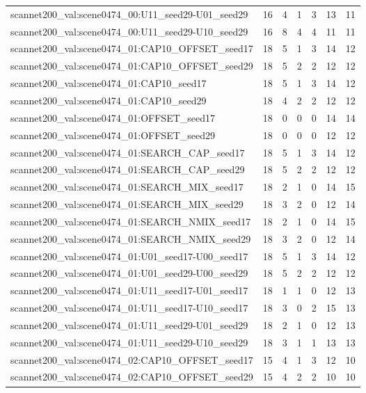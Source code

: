 \begin{table}[t]
\begin{tabular}{lrrrrrr}
scannet200\_val:scene0474\_00:U11\_seed29-U01\_seed29 & 16 & 4 & 1 & 3 & 13 & 11 \\
scannet200\_val:scene0474\_00:U11\_seed29-U10\_seed29 & 16 & 8 & 4 & 4 & 11 & 11 \\
scannet200\_val:scene0474\_01:CAP10\_OFFSET\_seed17 & 18 & 5 & 1 & 3 & 14 & 12 \\
scannet200\_val:scene0474\_01:CAP10\_OFFSET\_seed29 & 18 & 5 & 2 & 2 & 12 & 12 \\
scannet200\_val:scene0474\_01:CAP10\_seed17 & 18 & 5 & 1 & 3 & 14 & 12 \\
scannet200\_val:scene0474\_01:CAP10\_seed29 & 18 & 4 & 2 & 2 & 12 & 12 \\
scannet200\_val:scene0474\_01:OFFSET\_seed17 & 18 & 0 & 0 & 0 & 14 & 14 \\
scannet200\_val:scene0474\_01:OFFSET\_seed29 & 18 & 0 & 0 & 0 & 12 & 12 \\
scannet200\_val:scene0474\_01:SEARCH\_CAP\_seed17 & 18 & 5 & 1 & 3 & 14 & 12 \\
scannet200\_val:scene0474\_01:SEARCH\_CAP\_seed29 & 18 & 5 & 2 & 2 & 12 & 12 \\
scannet200\_val:scene0474\_01:SEARCH\_MIX\_seed17 & 18 & 2 & 1 & 0 & 14 & 15 \\
scannet200\_val:scene0474\_01:SEARCH\_MIX\_seed29 & 18 & 3 & 2 & 0 & 12 & 14 \\
scannet200\_val:scene0474\_01:SEARCH\_NMIX\_seed17 & 18 & 2 & 1 & 0 & 14 & 15 \\
scannet200\_val:scene0474\_01:SEARCH\_NMIX\_seed29 & 18 & 3 & 2 & 0 & 12 & 14 \\
scannet200\_val:scene0474\_01:U01\_seed17-U00\_seed17 & 18 & 5 & 1 & 3 & 14 & 12 \\
scannet200\_val:scene0474\_01:U01\_seed29-U00\_seed29 & 18 & 5 & 2 & 2 & 12 & 12 \\
scannet200\_val:scene0474\_01:U11\_seed17-U01\_seed17 & 18 & 1 & 1 & 0 & 12 & 13 \\
scannet200\_val:scene0474\_01:U11\_seed17-U10\_seed17 & 18 & 3 & 0 & 2 & 15 & 13 \\
scannet200\_val:scene0474\_01:U11\_seed29-U01\_seed29 & 18 & 2 & 1 & 0 & 12 & 13 \\
scannet200\_val:scene0474\_01:U11\_seed29-U10\_seed29 & 18 & 3 & 1 & 1 & 13 & 13 \\
scannet200\_val:scene0474\_02:CAP10\_OFFSET\_seed17 & 15 & 4 & 1 & 3 & 12 & 10 \\
scannet200\_val:scene0474\_02:CAP10\_OFFSET\_seed29 & 15 & 4 & 2 & 2 & 10 & 10 \\

\end{tabular}
\end{table}
